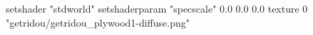 setshader "stdworld"
setshaderparam "specscale" 0.0 0.0 0.0
texture 0 "getridou/getridou_plywood1-diffuse.png"

